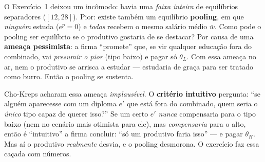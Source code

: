 \documentclass[11pt,a4paper]{article}
\begin{document}
\begin{empalavras}
O Exercício~1 deixou um incômodo: havia uma \emph{faixa inteira} de equilíbrios separadores
($[12,28]$). Pior: existe também um equilíbrio \textbf{pooling}, em que \emph{ninguém} estuda
($e^p=0$) e \emph{todos} recebem o mesmo salário médio $\bar w$. Como pode o pooling ser
equilíbrio se o produtivo gostaria de se destacar? Por causa de uma \textbf{ameaça pessimista}:
a firma ``promete'' que, se vir qualquer educação fora do combinado, vai \emph{presumir o pior}
(tipo baixo) e pagar só $\theta_L$. Com essa ameaça no ar, nem o produtivo se arrisca a estudar
— estudaria de graça para ser tratado como burro. Então o pooling se sustenta.

\smallskip\noindent
Cho-Kreps acharam essa ameaça \emph{implausível}. O \textbf{critério intuitivo} pergunta: ``se
alguém aparecesse com um diploma $e'$ que está fora do combinado, quem seria o \emph{único} tipo
capaz de querer isso?'' Se um certo $e'$ \emph{nunca} compensaria para o tipo baixo (nem no
cenário mais otimista para ele), mas \emph{compensaria} para o alto, então é ``intuitivo'' a
firma concluir: ``só um produtivo faria isso'' — e pagar $\theta_H$. Mas aí o produtivo
\emph{realmente} desvia, e o pooling desmorona. O exercício faz essa caçada com números.
\end{empalavras}
\end{document}
